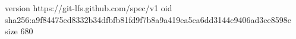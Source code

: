 version https://git-lfs.github.com/spec/v1
oid sha256:a9f84475ed8332b34dfbfb81fd9f7b8a9a419ea5ca6dd3144c9406ad3ce8598e
size 680
